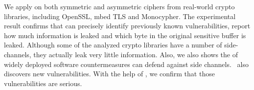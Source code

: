 


We apply \tool{} on both symmetric and asymmetric ciphers from real-world crypto
libraries, including OpenSSL, mbed TLS and Monocypher\@. The experimental result confirms
that \tool{} can precisely identify previously known vulnerabilities, report
how much information is leaked and which byte in the original sensitive buffer
is leaked. Although some of the analyzed crypto libraries have a number of
side-channels, they actually leak very little information. Also, we also shows the
of widely deployed software countermeasures can defend against side channels.
\tool\ also discovers new vulnerabilities. With the help of \tool{}, we confirm
that those vulnerabilities are serious.

